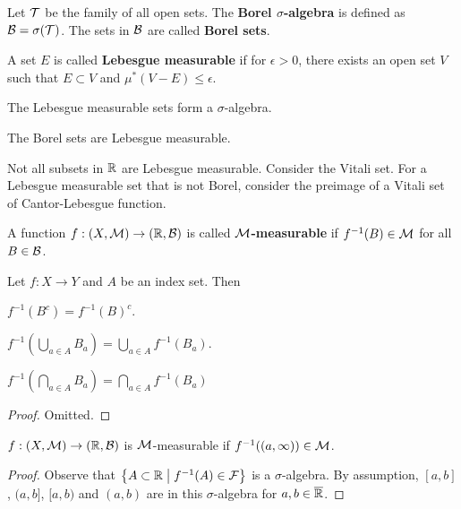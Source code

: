 \begin{definition}
    Let $\mathcal{T}$ be the family of all open sets. The \textbf{Borel $\sigma$-algebra} 
    is defined as $\mathcal{B} = \sigma(\mathcal{T})$. The sets in $\mathcal{B}$ are called 
    \textbf{Borel sets}.
\end{definition}

\begin{definition}
    A set $E$ is called \textbf{Lebesgue measurable} if for $\epsilon>0$, 
    there exists an open set $V$ such that $E\subset V$ and 
    $\mu^*(V-E)\leq\epsilon$. 
\end{definition}
\begin{remark}
    The Lebesgue measurable sets form a $\sigma$-algebra.
\end{remark}
\begin{remark}
    The Borel sets are Lebesgue measurable.
\end{remark}
\begin{remark}
    Not all subsets in $\mathbb{R}$ are Lebesgue measurable. Consider the 
    Vitali set. For a Lebesgue measurable set that is not Borel, 
    consider the preimage of a Vitali set of Cantor-Lebesgue function.
\end{remark}

\begin{definition}
    A function $f:(X,\mathcal{M})\to(\mathbb{R},\mathcal{B})$ is called \textbf{$\mathcal{M}$-measurable} if 
    $f^{-1}(B)\in\mathcal{M}$ for all $B\in\mathcal{B}$.
\end{definition}

\begin{proposition}
    Let $f:X\to Y$ and $A$ be an index set. Then 
    \begin{thmenum}
        \item $f^{-1}(B^c) = f^{-1}(B)^c$. 
        \item $f^{-1}(\bigcup_{a\in A} B_a) = \bigcup_{a\in A} f^{-1}(B_a)$. 
        \item $f^{-1}(\bigcap_{a\in A} B_a) = \bigcap_{a\in A} f^{-1}(B_a)$
    \end{thmenum}
\end{proposition}
\begin{proof}
    Omitted.
\end{proof}

\begin{proposition}
    $f:(X,\mathcal{M})\to(\mathbb{R},\mathcal{B})$ is $\mathcal{M}$-measurable if $f^{-1}((a,\infty))\in\mathcal{M}$.
\end{proposition}
\begin{proof}
    Observe that $\left\{ A\subset\mathbb{R} \;\middle\vert\; f^{-1}(A)\in\mathcal{F} \right\}$ is a $\sigma$-algebra. 
    By assumption, $[a,b]$, $(a,b]$, $[a,b)$ and $(a,b)$ are in this 
    $\sigma$-algebra for $a,b\in\overline{\mathbb{R}}$.
\end{proof}

